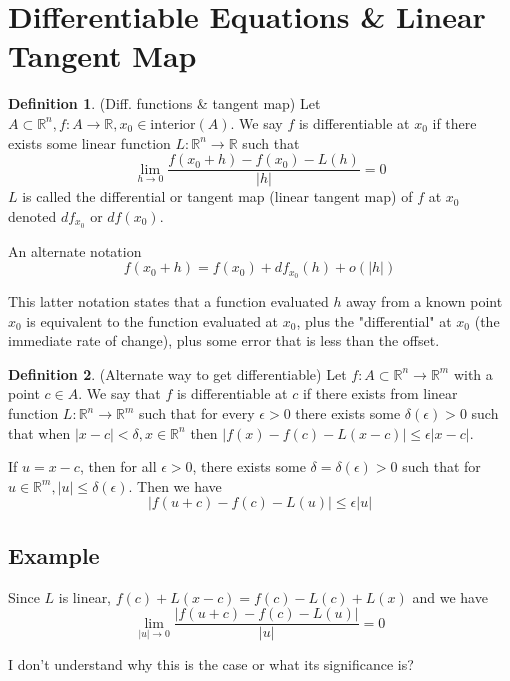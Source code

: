 \documentclass[12pt]{article}
\newcommand{\R}{\mathbb{R}}
\theoremstyle{definition}
\newtheorem{definition}{Definition}[section]
\theoremstyle{remark}
\newenvironment{question}[2][QUESTION]{\begin{trivlist}
\item[\hskip \labelsep {\bfseries #1}\hskip \labelsep {\bfseries #2.}]}{\end{trivlist}}
\begin{document}
\section{Differentiable Equations \& Linear Tangent Map}
\begin{definition}
(Diff. functions \& tangent map)
Let $A \subset \R^n, f:A\to\R, x_0\in\text{interior}(A)$. We say $f$ is differentiable at $x_0$ if there exists some linear function $L:\R^n\to\R$ such that 
\begin{equation}
    \lim_{h\to0}\frac{f(x_0+h)-f(x_0)-L(h)}{|h|}=0
\end{equation}
$L$ is called the differential or tangent map (linear tangent map) of $f$ at $x_0$ denoted $df_{x_0}$ or $df(x_0)$.

An alternate notation
\begin{equation}
    f(x_0+h)=f(x_0)+df_{x_0}(h)+o(|h|)
\end{equation}
\end{definition}
This latter notation states that a function evaluated $h$ away from a known point $x_0$ is equivalent to the function evaluated at $x_0$, plus the "differential" at $x_0$ (the immediate rate of change), plus some error that is less than the offset.
\begin{definition}
   (Alternate way to get differentiable) Let $f:A\subset\R^n\to\R^m$ with a point $c\in A$. We say that $f$ is differentiable at $c$ if there exists from linear function $L:\R^n\to\R^m$ such that for every $\epsilon > 0$ there exists some $\delta(\epsilon)>0$ such that when $|x-c|<\delta, x\in\R^n$ then $|f(x)-f(c)-L(x-c)|\leq \epsilon|x-c|$.

   If $u=x-c$, then for all $\epsilon>0$, there exists some $\delta=\delta(\epsilon)>0$ such that for $u\in\R^m, |u|\leq\delta(\epsilon)$. Then we have 
   \begin{equation}
      |f(u+c)-f(c)-L(u)|\leq\epsilon|u| 
   \end{equation}
\end{definition}

\subsection{Example}
Since $L$ is linear, $f(c)+L(x-c)=f(c)-L(c)+L(x)$ and we have 
$$\lim_{|u|\to0}\frac{|f(u+c)-f(c)-L(u)|}{|u|}=0$$
\begin{question}{2.1}
    I don't understand why this is the case or what its significance is?\vspace{2in} 
\end{question}
\end{document}
